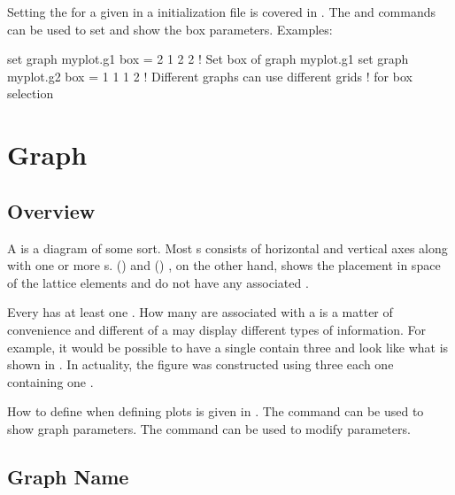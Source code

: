 {{Setting the  for a given  in a \tao initialization file is covered in .
The  and  commands can be used to set and show the box parameters. 
Examples:
\begin{example}
  set graph myplot.g1 box = 2 1 2 2  ! Set box of graph myplot.g1
  set graph myplot.g2 box = 1 1 1 2  ! Different graphs can use different grids
                                     !  for box selection
\end{example}

\section{Graph}
\label{s:graph.def}

\subsection{Overview}
\label{s:graph.overview}

A  is a diagram of some sort. Most s consists of horizontal and vertical axes
along with one or more s.  () and 
() , on the other hand, shows the placement in space of the lattice
elements and do not have any associated .

Every  has at least one . How many  are associated with a 
is a matter of convenience and different  of a  may display different types of
information. For example, it would be possible to have a single  contain three 
and look like what is shown in . In actuality, the figure was constructed using
three  each one containing one .

How to define  when defining  plots is given in . The
 command can be used to show graph parameters. The  command can
be used to modify  parameters.

\subsection{Graph Name}
\label{s:graph.name}

}}
